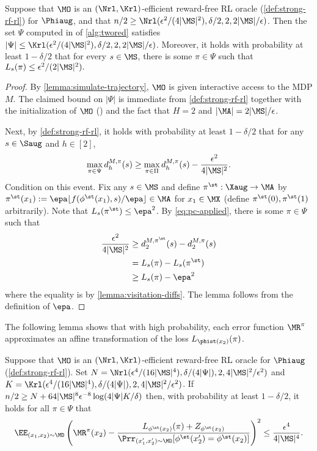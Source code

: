 \begin{lemma}\label{lemma:psi-guarantee}
Suppose that $\MO$ is an $(\Nrl,\Krl)$-efficient reward-free RL oracle (\cref{def:strong-rf-rl}) for $\Phiaug$, and that $n/2 \geq \Nrl(\epsilon^2/(4|\MS|^2),\delta/2,2,2|\MS|/\epsilon)$. Then the set $\Psi$ computed in  of \cref{alg:twored} satisfies $|\Psi| \leq \Krl(\epsilon^2/(4|\MS|^2),\delta/2,2,2|\MS|/\epsilon)$. Moreover, it holds with probability at least $1-\delta/2$ that for every $s \in \MS$, there is some $\pi \in \Psi$ such that 
$L_s(\pi) \leq \epsilon^2/(2|\MS|^2).$
\end{lemma}

\begin{proof}
By \cref{lemma:simulate-trajectory}, $\MO$ is given interactive access to the MDP $M$. The claimed bound on $|\Psi|$ is immediate from \cref{def:strong-rf-rl} together with the initialization of $\MO$ () and the fact that $H=2$ and $|\MA| = 2|\MS|/\epsilon$. 

Next, by \cref{def:strong-rf-rl}, it holds with probability at least $1-\delta/2$ that for any $s \in \Saug$ and $h \in [2]$,
\begin{equation} \max_{\pi\in\Psi} d^{M,\pi}_h(s) \geq \max_{\pi \in \Pi} d^{M,\pi}_h(s) - \frac{\epsilon^2}{4|\MS|^2}.\label{eq:pc-applied}
\end{equation}
Condition on this event. Fix any $s \in \MS$ and define $\pi^\st:\Xaug \to \MA$ by $\pi^\st(x_1) := \epa\lfloor f(\phi^\st(x_1),s)/\epa\rfloor \in \MA$ for $x_1 \in \MX$ (define $\pi^\st(0),\pi^\st(1)$ arbitrarily). Note that $L_s(\pi^\st) \leq \epa^2$. By \eqref{eq:pc-applied}, there is some $\pi \in \Psi$ such that
\begin{align*}
\frac{\epsilon^2}{4|\MS|^2}
&\geq d^{M,\pi^\st}_2(s) - d^{M,\pi}_2(s) \\ 
&= L_s(\pi) - L_s(\pi^\st) \\ 
&\geq L_s(\pi) - \epa^2
\end{align*}
where the equality is by \cref{lemma:visitation-diffs}. The lemma follows from the definition of $\epa$.
\end{proof}

The following lemma shows that with high probability, each error function $\MR^\pi$ approximates an affine transformation of the loss $L_{\phist(x_2)}(\pi)$.

\begin{lemma}\label{lemma:rpi-error}
Suppose that $\MO$ is an $(\Nrl,\Krl)$-efficient reward-free RL oracle for $\Phiaug$ (\cref{def:strong-rf-rl}). Set $N = \Nrl(\epsilon^4/(16|\MS|^4), \delta/(4|\Psi|),2,4|\MS|^2/\epsilon^2)$ and $K = \Krl(\epsilon^4/(16|\MS|^4), \delta/(4|\Psi|),2,4|\MS|^2/\epsilon^2)$. If $n/2 \geq N + 64|\MS|^8\epsilon^{-8}\log(4|\Psi|K/\delta)$ then, with probability at least $1-\delta/2$, it holds for all $\pi \in \Psi$ that
\[\EE_{(x_1,x_2)\sim\MD} \left(\MR^\pi(x_2) - \frac{L_{\phi^\st(x_2)}(\pi) + Z_{\phi^\st(x_2)}}{\Prr_{(x_1',x_2') \sim \MD}[\phi^\st(x_2')=\phi^\st(x_2)]}\right)^2 \leq \frac{\epsilon^4}{4|\MS|^4}.\]
\end{lemma}

